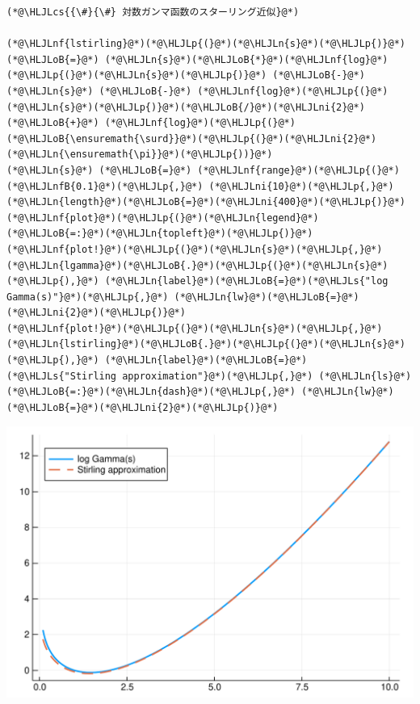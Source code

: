 \documentclass[12pt,a4paper,xelatex,ja=standard]{bxjsarticle}
\newcommand{\HLJLn}[1]{#1}
\newcommand{\HLJLnf}[1]{\textcolor[RGB]{66,102,213}{#1}}
\newcommand{\HLJLs}[1]{\textcolor[RGB]{201,61,57}{#1}}
\newcommand{\HLJLnfB}[1]{\textcolor[RGB]{59,151,46}{#1}}
\newcommand{\HLJLni}[1]{\textcolor[RGB]{59,151,46}{#1}}
\newcommand{\HLJLoB}[1]{\textcolor[RGB]{102,102,102}{\textbf{#1}}}
\newcommand{\HLJLp}[1]{#1}
\newcommand{\HLJLcs}[1]{\textcolor[RGB]{153,153,119}{\textit{#1}}}
\begin{document}
\begin{lstlisting}
(*@\HLJLcs{{\#}{\#} 対数ガンマ函数のスターリング近似}@*)

(*@\HLJLnf{lstirling}@*)(*@\HLJLp{(}@*)(*@\HLJLn{s}@*)(*@\HLJLp{)}@*) (*@\HLJLoB{=}@*) (*@\HLJLn{s}@*)(*@\HLJLoB{*}@*)(*@\HLJLnf{log}@*)(*@\HLJLp{(}@*)(*@\HLJLn{s}@*)(*@\HLJLp{)}@*) (*@\HLJLoB{-}@*) (*@\HLJLn{s}@*) (*@\HLJLoB{-}@*) (*@\HLJLnf{log}@*)(*@\HLJLp{(}@*)(*@\HLJLn{s}@*)(*@\HLJLp{)}@*)(*@\HLJLoB{/}@*)(*@\HLJLni{2}@*) (*@\HLJLoB{+}@*) (*@\HLJLnf{log}@*)(*@\HLJLp{(}@*)(*@\HLJLoB{\ensuremath{\surd}}@*)(*@\HLJLp{(}@*)(*@\HLJLni{2}@*)(*@\HLJLn{\ensuremath{\pi}}@*)(*@\HLJLp{))}@*)
(*@\HLJLn{s}@*) (*@\HLJLoB{=}@*) (*@\HLJLnf{range}@*)(*@\HLJLp{(}@*)(*@\HLJLnfB{0.1}@*)(*@\HLJLp{,}@*) (*@\HLJLni{10}@*)(*@\HLJLp{,}@*) (*@\HLJLn{length}@*)(*@\HLJLoB{=}@*)(*@\HLJLni{400}@*)(*@\HLJLp{)}@*)
(*@\HLJLnf{plot}@*)(*@\HLJLp{(}@*)(*@\HLJLn{legend}@*)(*@\HLJLoB{=:}@*)(*@\HLJLn{topleft}@*)(*@\HLJLp{)}@*)
(*@\HLJLnf{plot!}@*)(*@\HLJLp{(}@*)(*@\HLJLn{s}@*)(*@\HLJLp{,}@*) (*@\HLJLn{lgamma}@*)(*@\HLJLoB{.}@*)(*@\HLJLp{(}@*)(*@\HLJLn{s}@*)(*@\HLJLp{),}@*) (*@\HLJLn{label}@*)(*@\HLJLoB{=}@*)(*@\HLJLs{"log Gamma(s)"}@*)(*@\HLJLp{,}@*) (*@\HLJLn{lw}@*)(*@\HLJLoB{=}@*)(*@\HLJLni{2}@*)(*@\HLJLp{)}@*)
(*@\HLJLnf{plot!}@*)(*@\HLJLp{(}@*)(*@\HLJLn{s}@*)(*@\HLJLp{,}@*) (*@\HLJLn{lstirling}@*)(*@\HLJLoB{.}@*)(*@\HLJLp{(}@*)(*@\HLJLn{s}@*)(*@\HLJLp{),}@*) (*@\HLJLn{label}@*)(*@\HLJLoB{=}@*)(*@\HLJLs{"Stirling approximation"}@*)(*@\HLJLp{,}@*) (*@\HLJLn{ls}@*)(*@\HLJLoB{=:}@*)(*@\HLJLn{dash}@*)(*@\HLJLp{,}@*) (*@\HLJLn{lw}@*)(*@\HLJLoB{=}@*)(*@\HLJLni{2}@*)(*@\HLJLp{)}@*)
\end{lstlisting}


\begin{center}
\includegraphics[width=0.8\linewidth]{figures/テスト_2_1.pdf}
\end{center}
\end{document}
